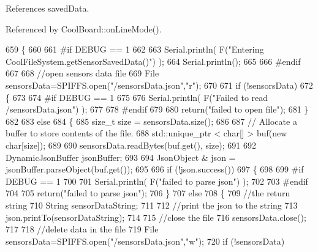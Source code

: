 References saved\+Data.



Referenced by Cool\+Board\+::on\+Line\+Mode().


\begin{DoxyCode}
659 \{
660 
661 \textcolor{preprocessor}{#if DEBUG == 1 }
662 
663     Serial.println( F(\textcolor{stringliteral}{"Entering CoolFileSystem.getSensorSavedData()"}) );
664     Serial.println();
665 
666 \textcolor{preprocessor}{#endif}
667 
668     \textcolor{comment}{//open sensors data file}
669     File sensorsData=SPIFFS.open(\textcolor{stringliteral}{"/sensorsData.json"},\textcolor{stringliteral}{"r"});
670     
671     \textcolor{keywordflow}{if} (!sensorsData)
672     \{
673 
674 \textcolor{preprocessor}{    #if DEBUG == 1 }
675 
676         Serial.println( F(\textcolor{stringliteral}{"Failed to read /sensorsData.json"}) );
677 
678 \textcolor{preprocessor}{    #endif}
679  
680         \textcolor{keywordflow}{return}(\textcolor{stringliteral}{"failed to open file"});
681     \}
682 
683     \textcolor{keywordflow}{else}
684     \{
685         \textcolor{keywordtype}{size\_t} size = sensorsData.size();
686 
687         \textcolor{comment}{// Allocate a buffer to store contents of the file.}
688         std::unique\_ptr < char[] > buf(\textcolor{keyword}{new} \textcolor{keywordtype}{char}[size]);
689 
690         sensorsData.readBytes(buf.get(), size);
691 
692         DynamicJsonBuffer jsonBuffer;
693 
694         JsonObject & json = jsonBuffer.parseObject(buf.get());
695         
696         \textcolor{keywordflow}{if} (!json.success())
697         \{
698 
699 \textcolor{preprocessor}{        #if DEBUG == 1}
700         
701             Serial.println( F(\textcolor{stringliteral}{"failed to parse json"}) );
702         
703 \textcolor{preprocessor}{        #endif}
704         
705             \textcolor{keywordflow}{return}(\textcolor{stringliteral}{"failed to parse json"});
706         \}
707         \textcolor{keywordflow}{else}
708         \{   
709             \textcolor{comment}{//the return string}
710             String sensorDataString;
711             
712             \textcolor{comment}{//print the json to the string}
713             json.printTo(sensorDataString);
714             
715             \textcolor{comment}{//close the file}
716             sensorsData.close();
717 
718             \textcolor{comment}{//delete data in the file}
719             File sensorsData=SPIFFS.open(\textcolor{stringliteral}{"/sensorsData.json"},\textcolor{stringliteral}{"w"});
720             \textcolor{keywordflow}{if} (!sensorsData)   

\end{DoxyCode}
